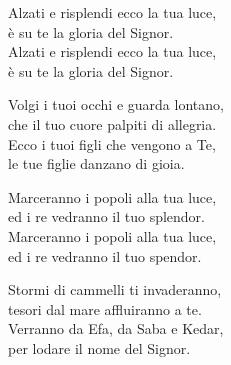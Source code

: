 
\strofa Alzati e risplendi ecco la tua luce,\\
è su te la gloria del Signor.\\
Alzati e risplendi ecco la tua luce,\\
è su te la gloria del Signor.

\spazio

Volgi i tuoi occhi e guarda lontano,\\
che il tuo cuore palpiti di allegria.\\
Ecco i tuoi figli che vengono a Te,\\
le tue figlie danzano di gioia.

\spazio


\spazio

\strofa Marceranno i popoli alla tua luce,\\
ed i re vedranno il tuo splendor.\\
Marceranno i popoli alla tua luce,\\
ed i re vedranno il tuo spendor.

\spazio

Stormi di cammelli ti invaderanno,\\
tesori dal mare affluiranno a te.\\
Verranno da Efa, da Saba e Kedar,\\
per lodare il nome del Signor.

\spazio

